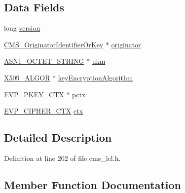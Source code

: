 \subsection*{Data Fields}
\begin{DoxyCompactItemize}
\item 
long \hyperlink{struct_c_m_s___key_agree_recipient_info__st_a17afc5cf84cee4b2123665f28ce85c9f}{version}
\item 
\hyperlink{cms__lcl_8h_ab3b0c12e27a4a93e217c0ba76c557776}{C\+M\+S\+\_\+\+Originator\+Identifier\+Or\+Key} $\ast$ \hyperlink{struct_c_m_s___key_agree_recipient_info__st_a579087b6bd749a0da2b081f45e425174}{originator}
\item 
\hyperlink{crypto_2ossl__typ_8h_afbd05e94e0f0430a2b729473efec88c1}{A\+S\+N1\+\_\+\+O\+C\+T\+E\+T\+\_\+\+S\+T\+R\+I\+NG} $\ast$ \hyperlink{struct_c_m_s___key_agree_recipient_info__st_a719047340a85c2aba26f083da2c420e2}{ukm}
\item 
\hyperlink{crypto_2ossl__typ_8h_aa2b6185e6254f36f709cd6577fb5022e}{X509\+\_\+\+A\+L\+G\+OR} $\ast$ \hyperlink{struct_c_m_s___key_agree_recipient_info__st_a02978e07483f6746f4f14141279dc4bb}{key\+Encryption\+Algorithm}
\item 
\hyperlink{crypto_2ossl__typ_8h_aaadbb75633e4460a52864970a3b875de}{E\+V\+P\+\_\+\+P\+K\+E\+Y\+\_\+\+C\+TX} $\ast$ \hyperlink{struct_c_m_s___key_agree_recipient_info__st_a948d2b6093ada6d39976bf4970cd2959}{pctx}
\item 
\hyperlink{crypto_2ossl__typ_8h_aab2bd6a044e1d31ebc2fe82b3b0b3d9a}{E\+V\+P\+\_\+\+C\+I\+P\+H\+E\+R\+\_\+\+C\+TX} \hyperlink{struct_c_m_s___key_agree_recipient_info__st_a2495707d38554dedf142a99b04a278f8}{ctx}
\end{DoxyCompactItemize}


\subsection{Detailed Description}


Definition at line 202 of file cms\+\_\+lcl.\+h.



\subsection{Member Function Documentation}
